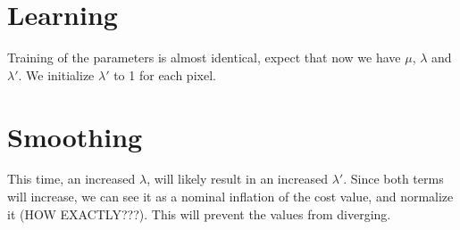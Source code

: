 \documentclass{report}
\begin{document}
\section{Learning}
Training of the parameters is almost identical, expect that now we have $\mu$, $\lambda$ and $\lambda'$. We initialize $\lambda'$ to 1 for each pixel.

\section{Smoothing}
This time, an increased $\lambda$, will likely result in an increased $\lambda'$. Since both terms will increase, we can see it as a nominal inflation of the cost value, and normalize it (HOW EXACTLY???). This will prevent the values from diverging.
\end{document}
